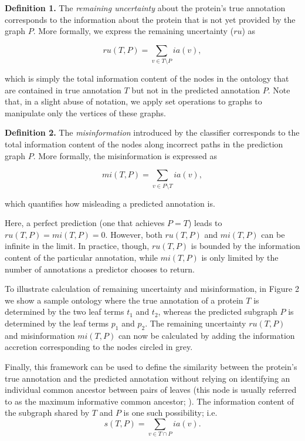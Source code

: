 \textbf{Definition 1.} The \emph{remaining uncertainty} about the protein's true annotation corresponds to the information about the protein that is not yet provided by the graph $P$. More formally, we express the remaining uncertainty ($ru$) as

\begin{equation}
ru(T,P)=\underset{v\in T\setminus P}{\sum}ia(v),
\label{eq:ruSIMP}
\end{equation}


\noindent which is simply the total information content of the nodes in the ontology that are contained in true annotation $T$ but not in the predicted annotation $P$. Note that, in a slight abuse of notation, we apply set operations to graphs to manipulate only the vertices of these graphs. %

\textbf{Definition 2.} The \emph{misinformation} introduced by the classifier corresponds to the total information content of the nodes along incorrect paths in the prediction graph $P$. More formally, the misinformation is expressed as

\begin{equation}
mi(T,P)=\underset{v\in P\setminus T}{\sum}ia(v),
\label{eq:miSIMP}
\end{equation}


\noindent which quantifies how misleading a predicted annotation is. 

Here, a perfect prediction (one that achieves $P=T$) leads to $ru(T,P)=mi(T,P)=0$.  However, both $ru(T,P)$ and $mi(T,P)$ can be infinite in the limit. In practice, though, $ru(T,P)$ is bounded by the information content of the particular annotation, while $mi(T,P)$ is only limited by the number of annotations a predictor chooses to return. 


To illustrate calculation of remaining uncertainty and misinformation, in Figure 2 we show a sample ontology where the true annotation of a protein $T$ is determined by the two leaf terms $t_{1}$ and $t_{2}$, whereas the predicted subgraph $P$ is determined by the leaf terms $p_{1}$ and $p_{2}.$ The remaining uncertainty $ru(T,P)$ and misinformation $mi(T,P)$ can now be calculated by adding the information accretion corresponding to the nodes circled in grey. 

Finally, this framework can be used to define the similarity between the protein's true annotation and the predicted annotation without relying on identifying an individual common ancestor between pairs of leaves (this node is usually referred to as the maximum informative common ancestor; \citealt{Guzzi2012}). The information content of the subgraph shared by $T$ and $P$ is one such possibility; i.e. 
\[
s(T,P)=\underset{v\in T\cap P}{\sum}ia(v).
\]


